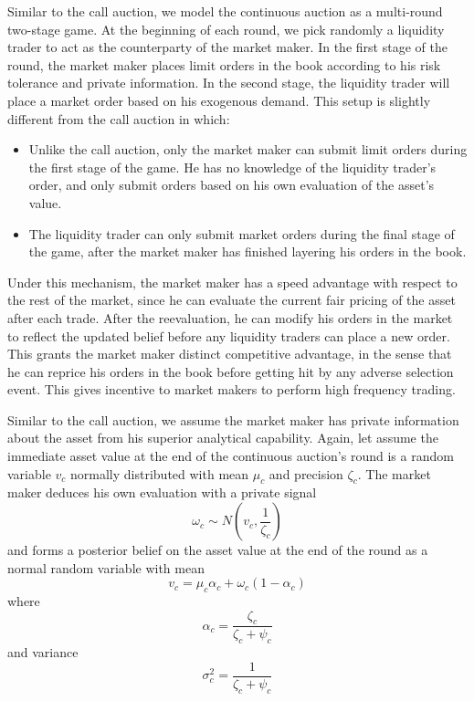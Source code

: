 Similar to the call auction, we model the continuous auction as a multi-round two-stage game. At the beginning of each round, we pick randomly a liquidity trader to act as the counterparty of the market maker. In the first stage of the round, the market maker places limit orders in the book according to his risk tolerance and private information. In the second stage, the liquidity trader will place a market order based on his exogenous demand. This setup is slightly different from the call auction in which:
\begin{itemize}
  \item Unlike the call auction, only the market maker can submit limit orders during the first stage of the game. He has no knowledge of the liquidity trader's order, and only submit orders based on his own evaluation of the asset's value.
  \item The liquidity trader can only submit market orders during the final stage of the game, after the market maker has finished layering his orders in the book.
\end{itemize}
Under this mechanism, the market maker has a speed advantage with respect to the rest of the market, since he can evaluate the current fair pricing of the asset after each trade. After the reevaluation, he can modify his orders in the market to reflect the updated belief before any liquidity traders can place a new order. This grants the market maker distinct competitive advantage, in the sense that he can reprice his orders in the book before getting hit by any adverse selection event. This gives incentive to market makers to perform high frequency trading.

Similar to the call auction, we assume the market maker has private information about the asset from his superior analytical capability. Again, let assume the immediate asset value at the end of the continuous auction's round is a random variable $v_c$ normally distributed with mean $\mu_c$ and precision $\zeta_c$. The market maker deduces his own evaluation with a private signal
\[
  \omega_c \sim N(v_c, \frac{1}{\zeta_c})
\]
and forms a posterior belief on the asset value at the end of the round as a normal random variable with mean
\[
  v_c=\mu_c \alpha_c + \omega_c(1 - \alpha_c)
\]
where
\[
  \alpha_c = \frac{\zeta_c}{\zeta_c+\psi_c}
\]
and variance
\[
  \sigma_c^2=\frac{1}{\zeta_c+\psi_c}
\]

